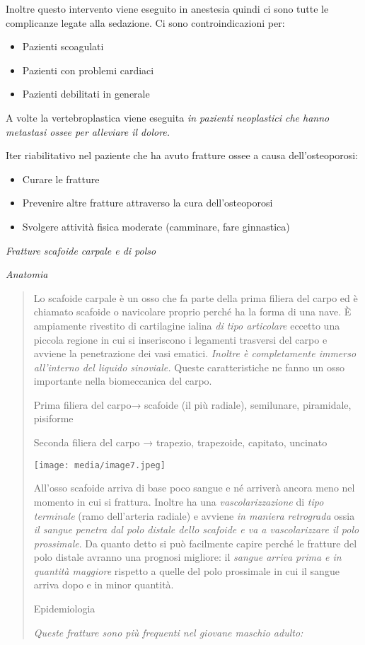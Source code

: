 \documentclass[]{article}
\begin{document}
Inoltre questo intervento viene eseguito in anestesia quindi ci sono
tutte le complicanze legate alla sedazione. Ci sono controindicazioni
per:

\begin{itemize}
\item
  Pazienti scoagulati
\item
  Pazienti con problemi cardiaci
\item
  Pazienti debilitati in generale
\end{itemize}

A volte la vertebroplastica viene eseguita \emph{in pazienti neoplastici
che hanno metastasi ossee per alleviare il dolore.}

Iter riabilitativo nel paziente che ha avuto fratture ossee a causa
dell'osteoporosi:

\begin{itemize}
\item
  Curare le fratture
\item
  Prevenire altre fratture attraverso la cura dell'osteoporosi
\item
  Svolgere attività fisica moderate (camminare, fare ginnastica)
\end{itemize}

\emph{Fratture scafoide carpale e di polso}

\emph{Anatomia}

\begin{quote}
Lo scafoide carpale è un osso che fa parte della prima filiera del carpo
ed è chiamato scafoide o navicolare proprio perché ha la forma di una
nave. È ampiamente rivestito di cartilagine ialina \emph{\emph{di tipo
articolare}} eccetto una piccola regione in cui si inseriscono i
legamenti trasversi del carpo e avviene la penetrazione dei vasi
ematici. \emph{Inoltre è completamente immerso all'interno del liquido
sinoviale.} Queste caratteristiche ne fanno un osso importante nella
biomeccanica del carpo.

Prima filiera del carpo→ scafoide (il più radiale), semilunare,
piramidale, pisiforme

Seconda filiera del carpo → trapezio, trapezoide, capitato, uncinato

\texttt{[image: media/image7.jpeg]}

All'osso scafoide arriva di base poco sangue e né arriverà ancora meno
nel momento in cui si frattura. Inoltre ha una \emph{vascolarizzazione}
di \emph{tipo terminale} (ramo dell'arteria radiale) e avviene \emph{in
maniera retrograda} ossia \emph{il sangue penetra dal polo distale dello
scafoide e va a vascolarizzare il polo prossimale}. Da quanto detto si
può facilmente capire perché le fratture del polo distale avranno una
prognosi migliore: il \emph{sangue arriva prima e in quantità maggiore}
rispetto a quelle del polo prossimale in cui il sangue arriva dopo e in
minor quantità.

Epidemiologia

\emph{Queste fratture sono più frequenti nel giovane maschio adulto:}
\end{quote}
\end{document}
